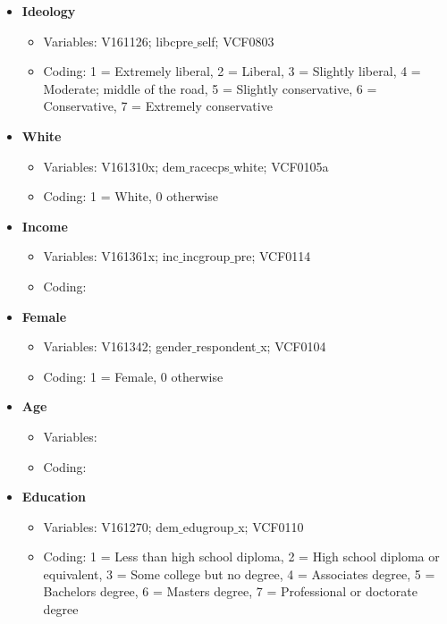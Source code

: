 \documentclass[12pt]{article}
\begin{document}
\begin{appendices}
\begin{refsection}
\begin{itemize}
	\item \textbf{Ideology}
	\begin{itemize}
		\item Variables: V161126; libcpre$\_$self; VCF0803
		\item Coding: 1 = Extremely liberal, 2 = Liberal, 3 = Slightly liberal, 4 = Moderate; middle of the road, 5 = Slightly conservative, 6 = Conservative, 7 = Extremely conservative
	\end{itemize}
	
	\item \textbf{White}
	\begin{itemize}
		\item Variables: V161310x; dem$\_$racecps$\_$white; VCF0105a
		\item Coding: 1 = White, 0 otherwise
	\end{itemize}
	
	\item \textbf{Income}
	\begin{itemize}
		\item Variables: V161361x; inc$\_$incgroup$\_$pre; VCF0114
		\item Coding:
	\end{itemize} 
	
	\item \textbf{Female}
	\begin{itemize}
		\item Variables: V161342; gender$\_$respondent$\_$x; VCF0104
		\item Coding: 1 = Female, 0 otherwise
	\end{itemize}
	
	\item \textbf{Age}
	\begin{itemize}
		\item Variables:
		\item Coding:
	\end{itemize}
	
	\item \textbf{Education}
	\begin{itemize}
		\item Variables: V161270; dem$\_$edugroup$\_$x; VCF0110
		\item Coding: 1 = Less than high school diploma, 2 = High school diploma or equivalent, 3 = Some college but no degree, 4 = Associates degree, 5 = Bachelors degree, 6 = Masters degree, 7 = Professional or doctorate degree
	\end{itemize}
	

\end{itemize}
\end{refsection}
\end{appendices}
\end{document}

